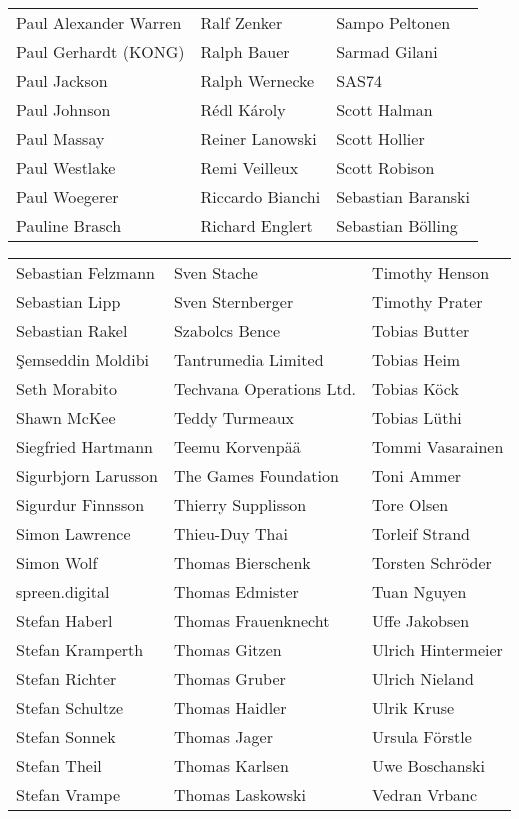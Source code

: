 \begin{tabular}{p{4.5cm}p{4.5cm}p{4.5cm}}
Paul Alexander Warren & Ralf Zenker & Sampo Peltonen \\
Paul Gerhardt (KONG) & Ralph Bauer & Sarmad Gilani \\
Paul Jackson & Ralph Wernecke & SAS74 \\
Paul Johnson & Rédl Károly & Scott Halman \\
Paul Massay & Reiner Lanowski & Scott Hollier \\
Paul Westlake & Remi Veilleux & Scott Robison \\
Paul Woegerer & Riccardo Bianchi & Sebastian Baranski \\
Pauline Brasch & Richard Englert & Sebastian Bölling \\
\end{tabular}
\newpage
\setlength{\tabcolsep}{1mm}
\begin{tabular}{p{4.5cm}p{4.5cm}p{4.5cm}}
Sebastian Felzmann & Sven Stache & Timothy Henson \\
Sebastian Lipp & Sven Sternberger & Timothy Prater \\
Sebastian Rakel & Szabolcs Bence & Tobias Butter \\
Şemseddin Moldibi & Tantrumedia Limited & Tobias Heim \\
Seth Morabito & Techvana Operations Ltd. & Tobias Köck \\
Shawn McKee & Teddy Turmeaux & Tobias Lüthi \\
Siegfried Hartmann & Teemu Korvenpää & Tommi Vasarainen \\
Sigurbjorn Larusson & The Games Foundation & Toni Ammer \\
Sigurdur Finnsson & Thierry Supplisson & Tore Olsen \\
Simon Lawrence & Thieu-Duy Thai & Torleif Strand \\
Simon Wolf & Thomas Bierschenk & Torsten Schröder \\
spreen.digital & Thomas Edmister & Tuan Nguyen \\
Stefan Haberl & Thomas Frauenknecht & Uffe Jakobsen \\
Stefan Kramperth & Thomas Gitzen & Ulrich Hintermeier \\
Stefan Richter & Thomas Gruber & Ulrich Nieland \\
Stefan Schultze & Thomas Haidler & Ulrik Kruse \\
Stefan Sonnek & Thomas Jager & Ursula Förstle \\
Stefan Theil & Thomas Karlsen & Uwe Boschanski \\
Stefan Vrampe & Thomas Laskowski & Vedran Vrbanc \\

\end{tabular}
